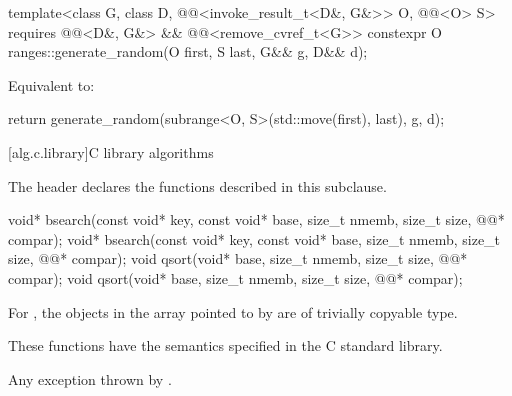 \begin{itemdecl}
template<class G, class D, @@<invoke_result_t<D&, G&>> O, @@<O> S>
  requires @@<D&, G&> && @@<remove_cvref_t<G>>
constexpr O ranges::generate_random(O first, S last, G&& g, D&& d);
\end{itemdecl}

\begin{itemdescr}
\pnum
\effects
Equivalent to:
\begin{codeblock}
return generate_random(subrange<O, S>(std::move(first), last), g, d);
\end{codeblock}
\end{itemdescr}

[alg.c.library]{C library algorithms}

\pnum
\begin{note}
The header 
declares the functions described in this subclause.
\end{note}

%
%
\begin{itemdecl}
void* bsearch(const void* key, const void* base, size_t nmemb, size_t size,
              @@* compar);
void* bsearch(const void* key, const void* base, size_t nmemb, size_t size,
              @@* compar);
void qsort(void* base, size_t nmemb, size_t size, @@* compar);
void qsort(void* base, size_t nmemb, size_t size, @@* compar);
\end{itemdecl}

\begin{itemdescr}
\pnum
\expects
For , the objects in the array pointed to by 
are of trivially copyable type.

\pnum
\effects
These functions have the semantics specified in the C standard library.

\pnum
\throws
Any exception thrown by .
\end{itemdescr}

